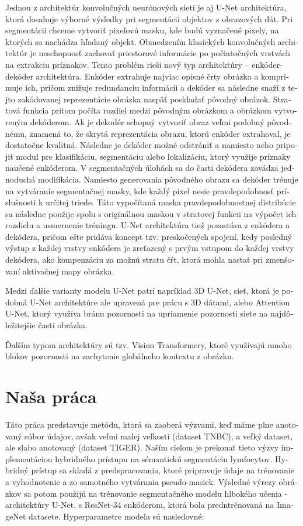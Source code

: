 \begin{otherlanguage}{slovak}
Jednou z architektúr konvolučných neurónových sietí je aj U-Net architektúra, ktorá dosahuje výborné výsledky pri segmentácii objektov z obrazových dát. Pri segmentácii chceme vytvoriť pixelovú masku, kde budú vyznačené pixely, na ktorých sa nachádza hľadaný objekt. Obmedzením klasických konvolučných architektúr je neschopnosť zachovať priestorové informácie po počiatočných vrstvách na extrakciu príznakov. Tento problém rieši nový typ architektúry – enkóder-dekóder architektúra. Enkóder extrahuje najviac opisné črty obrázka a komprimuje ich, pričom znižuje redundanciu informácii a dekóder sa následne snaží z tejto zakódovanej reprezentácie obrázka naspäť poskladať pôvodný obrázok. Stratová funkcia pritom počíta rozdiel medzi pôvodným obrázkom a obrázkom vytvoreným dekóderom. Ak je dekodér schopný vytvoriť obraz veľmi podobný pôvodnému, znamená to, že skrytá reprezentácia obrazu, ktorú enkóder extrahoval, je dostatočne kvalitná. Následne je dekóder možné odstrániť a namiesto neho pripojiť modul pre klasifikáciu, segmentáciu alebo lokalizáciu, ktorý využije príznaky naučené enkóderom. V segmentačných úlohách sa do časti dekódera zavádza jednoduchá modifikácia. Namiesto generovania pôvodného obrazu sa dekóder trénuje na vytváranie segmentačnej masky, kde každý pixel nesie pravdepodobnosť príslušnosti k určitej triede. Táto vypočítaná maska pravdepodobnostnej distribúcie sa následne použije spolu s originálnou maskou v stratovej funkcii na výpočet ich rozdielu a usmernenie tréningu. U-Net architektúra tiež pozostáva z enkódera a dekódera, pričom ešte pridáva koncept tzv. preskočených spojení, kedy posledný výstup z každej vrstvy enkódera je zreťazený s prvým vstupom do každej vrstvy dekódera, ako kompenzáciu za možnú stratu čŕt, ktorá mohla nastať pri zmenšovaní aktivačnej mapy obrázka.

Medzi ďalšie varianty modelu U-Net patrí napríklad 3D U-Net, sieť, ktorá je podobná U-Net architektúre ale upravená pre prácu s 3D dátami, alebo Attention U-Net, ktorý využíva bránu pozornosti na upriamenie pozornosti siete na najdôležitejšie časti obrázka.

Ďalším typom architektúry sú tzv. Vision Transformery, ktoré využívajú mnoho blokov pozornosti na zachytenie globálneho kontextu z obrázku.

\section{Naša práca}
Táto práca predstavuje metódu, ktorá sa zaoberá výzvami, keď máme plne anotovaný súbor údajov, avšak veľmi malej veľkosti (dataset TNBC), a veľký dataset, ale slabo anotovaný (dataset TIGER). Naším cieľom je prekonať tieto výzvy implementáciou hybridného prístupu na sémantickú segmentáciu lymfocytov. Hybridný prístup sa skladá z predspracovania, ktoré pripravuje údaje na trénovanie a vyhodnotenie a zo samotného vytvárania pseudo-masiek. Výsledné výrezy obrázkov sa potom použijú na trénovanie segmentačného modelu hlbokého učenia - architektúry U-Net, s ResNet-34 enkóderom, ktorá bola predntrénovaná na ImageNet datasete. Hyperparametre modela sú nasledovné:


\end{otherlanguage}
